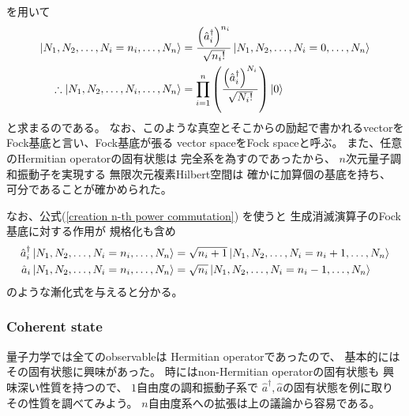 を用いて
\begin{align}
    \ket{N_1, N_2,\dots,N_i=n_i,\dots, N_n}
    &=
    \dfrac{
        \left(
            \hat{a}_i^\dagger
        \right)^{n_i}
    }{\sqrt{n_i!}}
    \ket{N_1, N_2,\dots,
    N_i = 0,
    \dots, N_n}
\notag\\\therefore
    \ket{N_1, N_2,\dots,N_i,\dots, N_n}
    &=
    \prod_{i=1}^n
    \left(
        \dfrac{
            \left(
                \hat{a}_i^\dagger
            \right)^{N_i}
        }{\sqrt{N_i!}}
    \right)
    \ket{0}
\end{align}
と求まるのである。
なお、このような真空とそこからの励起で書かれるvectorを
Fock基底と言い、Fock基底が張る
vector spaceをFock spaceと呼ぶ。
また、任意のHermitian operatorの固有状態は
完全系を為すのであったから、
$n$次元量子調和振動子を実現する
無限次元複素Hilbert空間は
確かに加算個の基底を持ち、
可分であることが確かめられた。

なお、公式(\ref{creation n-th power commutation})
を使うと
生成消滅演算子のFock基底に対する作用が
規格化も含め
\begin{subequations}
\begin{align}
    \hat{a}_i^\dagger
    \ket{N_1, N_2,\dots,N_i=n_i,\dots, N_n}
    &=
    \sqrt{n_i+1}
    \ket{N_1, N_2,\dots,N_i=n_i+1,\dots, N_n}
\\
    \hat{a}_i
    \ket{N_1, N_2,\dots,N_i=n_i,\dots, N_n}
    &=
    \sqrt{n_i}
    \ket{N_1, N_2,\dots,N_i=n_i-1,\dots, N_n}
\end{align}
\end{subequations}
のような漸化式を与えると分かる。

\subsubsection{Coherent state}

量子力学では全てのobservableは
Hermitian operatorであったので、
基本的にはその固有状態に興味があった。
時にはnon-Hermitian operatorの固有状態も
興味深い性質を持つので、
$1$自由度の調和振動子系で
$\hat{a}^\dagger, \hat{a}$の固有状態を例に取り
その性質を調べてみよう。
$n$自由度系への拡張は上の議論から容易である。

